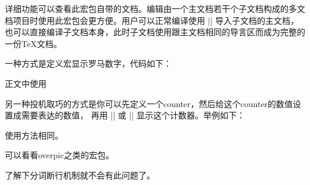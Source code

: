
详细功能可以查看此宏包自带的文档。编辑由一个主文档若干个子文档构成的多文档项目时使用此宏包会更方便。用户可以正常编译使用
|| 导入子文档的主文档，也可以直接编译子文档本身，此时子文档使用跟主文档相同的导言区而成为完整的一份\TeX{}文档。

















一种方式是定义宏显示罗马数字，代码如下：
\begin{texlist}
  \newcommand{\Myroman}[1]{\romannumeral #1}
  \newcommand{\MyRoman}[1]{\expandafter\@slowromancap\romannumeral #1@}
\end{texlist}
正文中使用
\begin{texlist}
   
\end{texlist}

另一种投机取巧的方式是你可以先定义一个counter，然后给这个counter的数值设置成需要表达的数值，
再用 |\Roman| 或 |\roman| 显示这个计数器。举例如下：
\begin{texlist}
  \newcommand{\MyRoman}[1]{\setcounter{romannum}{#1}\Roman{romannum}}
  \newcommand{\Myroman}[1]{\setcounter{romannum}{#1}\roman{romannum}}
\end{texlist}
使用方法相同。



\begin{texlist}
\end{texlist}



可以看看overpic之类的宏包。



了解下分词断行机制就不会有此问题了。



